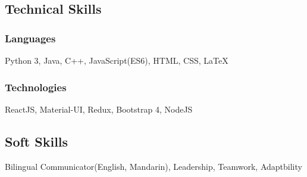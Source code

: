 \documentclass[letterpaper,11pt]{article}
\begin{document}
\begin{multicols}{2}
\subsection{Technical Skills}

\subsubsection{Languages}

\begin{adjustwidth}{4em}{}
Python 3, Java, C++, JavaScript(ES6), HTML, CSS, {\LaTeX}
\end{adjustwidth}

\subsubsection{Technologies}

\begin{adjustwidth}{4em}{}
ReactJS, Material-UI, Redux, Bootstrap 4, NodeJS
\end{adjustwidth}

\columnbreak

\subsection{Soft Skills}

\begin{adjustwidth}{2em}{}
Bilingual Communicator(English, Mandarin), Leadership, Teamwork, Adaptbility
\end{adjustwidth}

\end{multicols}
\end{document}
